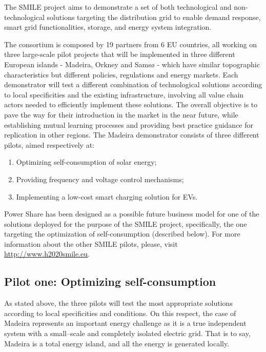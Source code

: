 The SMILE project aims to demonstrate a set of both technological and non-technological solutions targeting the distribution grid to enable demand response, smart grid functionalities, storage, and energy system integration.



The consortium is composed by 19 partners from 6 EU countries, all working on three large-scale pilot projects that will be implemented in three different European islands - Madeira, Orkney and Samsø - which have similar topographic characteristics but different policies, regulations and energy markets. Each demonstrator will test a different combination of technological solutions according to local specificities and the existing infrastructure, involving all value chain actors needed to efficiently implement these solutions. The overall objective is to pave the way for their introduction in the market in the near future, while establishing mutual learning processes and providing best practice guidance for replication in other regions. The Madeira demonstrator consists of three different pilots, aimed respectively at:

\begin{enumerate}
\item Optimizing self-consumption of solar energy;
\item Providing frequency and voltage control mechanisms;
\item Implementing a low-cost smart charging solution for \acp{EV}.
\end{enumerate}

Power Share has been designed as a possible future business model for one of the solutions deployed for the purpose of the SMILE project, specifically, the one targeting the optimization of self-consumption (described below). For more information about the other SMILE pilots, please, visit \url{http://www.h2020smile.eu}.


\subsection{Pilot one: Optimizing self-consumption}

As stated above, the three pilots will test the most appropriate solutions according to local specificities and conditions. On this respect, the case of Madeira represents an important energy challenge as it is a true independent system with a small--scale and completely isolated electric grid. That is to say, Madeira is a total energy island, and all the energy is generated locally.




